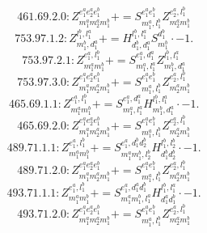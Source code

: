 \documentclass[letterpaper,10pt,fleqn,leqno,onecolumn]{article}
\begin{document}
\begin{equation} \;\;\;\;\;\;  461.69.2.0: Z^{e_{1}^{a}e_{2}^{a}e_{1}^{b}}_{m_{1}^{a}m_{2}^{a}m_{1}^{b}}+=S^{e_{1}^{a}e_{1}^{b}}_{m_{1}^{a},l_{1}^{b}}Z^{e_{2}^{a},l_{1}^{b}}_{m_{2}^{a}m_{1}^{b}} \end{equation}
\begin{equation} \;\;\;\;\;\;  753.97.1.2: Z^{l_{1}^{b},l_{1}^{a}}_{m_{1}^{b},d_{1}^{a}}+=H^{l_{1}^{b},l_{1}^{a}}_{d_{1}^{b},d_{1}^{a}}S^{d_{1}^{b}}_{m_{1}^{b}}\cdot -1. \end{equation}
\begin{equation} \;\;\;\;\;\;  753.97.2.1: Z^{e_{1}^{a},l_{1}^{b}}_{m_{1}^{a}m_{1}^{b}}+=S^{e_{1}^{a},d_{1}^{a}}_{m_{1}^{a},l_{1}^{a}}Z^{l_{1}^{b},l_{1}^{a}}_{m_{1}^{b},d_{1}^{a}} \end{equation}
\begin{equation} \;\;\;\;\;\;  753.97.3.0: Z^{e_{1}^{a}e_{2}^{a}e_{1}^{b}}_{m_{1}^{a}m_{2}^{a}m_{1}^{b}}+=S^{e_{1}^{a}e_{1}^{b}}_{m_{1}^{a},l_{1}^{b}}Z^{e_{2}^{a},l_{1}^{b}}_{m_{2}^{a}m_{1}^{b}} \end{equation}
\begin{equation} \;\;\;\;\;\;  465.69.1.1: Z^{e_{1}^{a},l_{1}^{b}}_{m_{1}^{a}m_{1}^{b}}+=S^{e_{1}^{a},d_{1}^{a}}_{m_{1}^{a},l_{1}^{a}}H^{l_{1}^{b},l_{1}^{a}}_{m_{1}^{b},d_{1}^{a}}\cdot -1. \end{equation}
\begin{equation} \;\;\;\;\;\;  465.69.2.0: Z^{e_{1}^{a}e_{2}^{a}e_{1}^{b}}_{m_{1}^{a}m_{2}^{a}m_{1}^{b}}+=S^{e_{1}^{a}e_{1}^{b}}_{m_{1}^{a},l_{1}^{b}}Z^{e_{2}^{a},l_{1}^{b}}_{m_{2}^{a}m_{1}^{b}} \end{equation}
\begin{equation} \;\;\;\;\;\;  489.71.1.1: Z^{e_{1}^{a},l_{1}^{b}}_{m_{1}^{a}m_{1}^{b}}+=S^{e_{1}^{a},d_{1}^{b}d_{2}^{b}}_{m_{1}^{a}m_{1}^{b},l_{2}^{b}}H^{l_{1}^{b},l_{2}^{b}}_{d_{1}^{b}d_{2}^{b}}\cdot -1. \end{equation}
\begin{equation} \;\;\;\;\;\;  489.71.2.0: Z^{e_{1}^{a}e_{2}^{a}e_{1}^{b}}_{m_{1}^{a}m_{2}^{a}m_{1}^{b}}+=S^{e_{1}^{a}e_{1}^{b}}_{m_{1}^{a},l_{1}^{b}}Z^{e_{2}^{a},l_{1}^{b}}_{m_{2}^{a}m_{1}^{b}} \end{equation}
\begin{equation} \;\;\;\;\;\;  493.71.1.1: Z^{e_{1}^{a},l_{1}^{b}}_{m_{1}^{a}m_{1}^{b}}+=S^{e_{1}^{a},d_{1}^{a}d_{1}^{b}}_{m_{1}^{a}m_{1}^{b},l_{1}^{a}}H^{l_{1}^{b},l_{1}^{a}}_{d_{1}^{a}d_{1}^{b}}\cdot -1. \end{equation}
\begin{equation} \;\;\;\;\;\;  493.71.2.0: Z^{e_{1}^{a}e_{2}^{a}e_{1}^{b}}_{m_{1}^{a}m_{2}^{a}m_{1}^{b}}+=S^{e_{1}^{a}e_{1}^{b}}_{m_{1}^{a},l_{1}^{b}}Z^{e_{2}^{a},l_{1}^{b}}_{m_{2}^{a}m_{1}^{b}} \end{equation}
\end{document}
